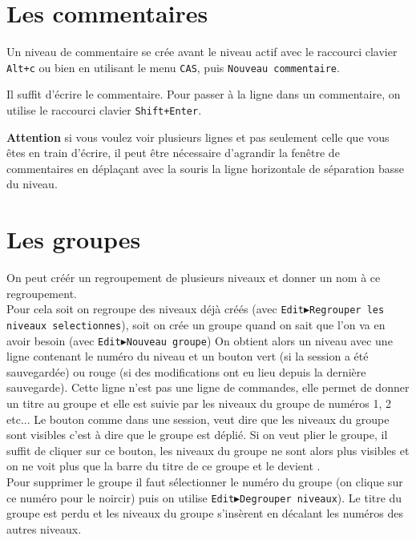 \documentclass[a4paper,11pt]{article}
\begin{document}
\section{Les commentaires}
Un niveau de commentaire se cr\'ee avant le niveau actif avec le raccourci 
clavier {\tt Alt+c} ou bien en utilisant le menu {\tt CAS},
 puis {\tt Nouveau commentaire}.

Il suffit d'\'ecrire le commentaire. Pour passer \`a la ligne dans un
commentaire, on utilise le raccourci clavier {\tt Shift+Enter}.

{\bf Attention} si vous voulez voir plusieurs lignes et pas seulement celle 
que vous \^etes en train d'\'ecrire, il peut \^etre n\'ecessaire d'agrandir la 
fen\^etre de commentaires en d\'epla\c{c}ant avec la souris la ligne 
horizontale de s\'eparation basse du niveau.

\section{Les groupes}
On peut cr\'e\'er un regroupement de plusieurs niveaux et donner un nom \`a ce
regroupement.\\
Pour cela soit on regroupe des niveaux d\'ej\`a cr\'e\'es (avec 
{\tt Edit}$\blacktriangleright${\tt Regrouper les niveaux selectionnes}), soit 
on cr\'ee un groupe quand on sait que l'on va en avoir besoin (avec 
{\tt Edit}$\blacktriangleright${\tt Nouveau groupe})
On obtient alors un niveau avec une ligne contenant le num\'ero du
niveau et un bouton \framebox{\tt -}  vert (si la session a \'et\'e 
sauvegard\'ee) ou rouge (si des modifications ont eu lieu depuis la derni\`ere 
sauvegarde). Cette ligne n'est pas une ligne de commandes, elle permet de 
donner un titre au groupe et elle est suivie par les niveaux du groupe de 
num\'eros 1, 2 etc...
Le bouton \framebox{\tt -} comme dans une session, veut dire que les niveaux du
groupe sont visibles c'est \`a dire que le groupe est d\'epli\'e. Si on veut 
plier le groupe, il suffit de cliquer sur ce bouton, les niveaux du groupe ne 
sont alors plus visibles et on ne voit plus que la barre du titre de ce groupe 
et le \framebox{\tt -} devient \framebox{\tt +}.\\
Pour supprimer le groupe il faut s\'electionner le num\'ero du groupe (on 
clique sur ce num\'ero pour le noircir) puis on utilise 
{\tt Edit}$\blacktriangleright${\tt Degrouper niveaux}). Le titre du groupe est
perdu et les niveaux du groupe s'ins\`erent en d\'ecalant les num\'eros des 
autres niveaux.
\end{document}
